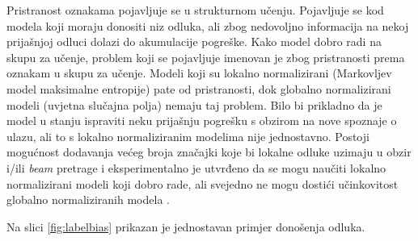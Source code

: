 Pristranost oznakama  pojavljuje se u strukturnom učenju.
Pojavljuje se kod modela koji moraju donositi niz odluka, ali zbog nedovoljno
informacija na nekoj prijašnjoj odluci dolazi do akumulacije pogreške. Kako
model dobro radi na skupu za učenje, problem koji se pojavljuje imenovan je zbog
pristranosti prema oznakam u skupu za učenje. Modeli koji su lokalno
normalizirani (Markovljev model maksimalne entropije) pate od pristranosti, dok
globalno normalizirani modeli (uvjetna slučajna polja) nemaju taj problem. Bilo
bi prikladno da je model u stanju ispraviti neku prijašnju pogrešku s obzirom na
nove spoznaje o ulazu, ali to s lokalno normaliziranim modelima nije
jednostavno. Postoji mogućnost dodavanja većeg broja značajki koje bi lokalne
odluke uzimaju u obzir i/ili \textit{beam} pretrage i eksperimentalno je
utvrđeno da se mogu naučiti lokalno normalizirani modeli koji dobro rade, ali
svejedno ne mogu dostići učinkovitost globalno normaliziranih modela
\citep{liang2008structure}.

Na slici \ref{fig:labelbias} prikazan je jednostavan primjer donošenja odluka.

